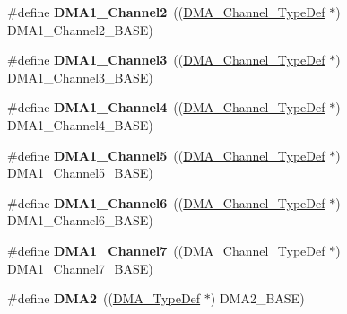 \begin{DoxyCompactItemize}
\item 
\hypertarget{group___peripheral__declaration_ga23d7631dd10c645e06971b2543ba2949}{\#define {\bfseries D\-M\-A1\-\_\-\-Channel2}~((\hyperlink{struct_d_m_a___channel___type_def}{D\-M\-A\-\_\-\-Channel\-\_\-\-Type\-Def} $\ast$) D\-M\-A1\-\_\-\-Channel2\-\_\-\-B\-A\-S\-E)}\label{group___peripheral__declaration_ga23d7631dd10c645e06971b2543ba2949}

\item 
\hypertarget{group___peripheral__declaration_gacf7b6093a37b306d7f1f50b2f200f0d0}{\#define {\bfseries D\-M\-A1\-\_\-\-Channel3}~((\hyperlink{struct_d_m_a___channel___type_def}{D\-M\-A\-\_\-\-Channel\-\_\-\-Type\-Def} $\ast$) D\-M\-A1\-\_\-\-Channel3\-\_\-\-B\-A\-S\-E)}\label{group___peripheral__declaration_gacf7b6093a37b306d7f1f50b2f200f0d0}

\item 
\hypertarget{group___peripheral__declaration_gad2c42743316bf64da557130061b1f56a}{\#define {\bfseries D\-M\-A1\-\_\-\-Channel4}~((\hyperlink{struct_d_m_a___channel___type_def}{D\-M\-A\-\_\-\-Channel\-\_\-\-Type\-Def} $\ast$) D\-M\-A1\-\_\-\-Channel4\-\_\-\-B\-A\-S\-E)}\label{group___peripheral__declaration_gad2c42743316bf64da557130061b1f56a}

\item 
\hypertarget{group___peripheral__declaration_ga06ff98ddef3c962795d2e2444004abff}{\#define {\bfseries D\-M\-A1\-\_\-\-Channel5}~((\hyperlink{struct_d_m_a___channel___type_def}{D\-M\-A\-\_\-\-Channel\-\_\-\-Type\-Def} $\ast$) D\-M\-A1\-\_\-\-Channel5\-\_\-\-B\-A\-S\-E)}\label{group___peripheral__declaration_ga06ff98ddef3c962795d2e2444004abff}

\item 
\hypertarget{group___peripheral__declaration_gac013c4376e4797831b5ddd2a09519df8}{\#define {\bfseries D\-M\-A1\-\_\-\-Channel6}~((\hyperlink{struct_d_m_a___channel___type_def}{D\-M\-A\-\_\-\-Channel\-\_\-\-Type\-Def} $\ast$) D\-M\-A1\-\_\-\-Channel6\-\_\-\-B\-A\-S\-E)}\label{group___peripheral__declaration_gac013c4376e4797831b5ddd2a09519df8}

\item 
\hypertarget{group___peripheral__declaration_ga4f9c23b3d1add93ed206b5c9afa5cda3}{\#define {\bfseries D\-M\-A1\-\_\-\-Channel7}~((\hyperlink{struct_d_m_a___channel___type_def}{D\-M\-A\-\_\-\-Channel\-\_\-\-Type\-Def} $\ast$) D\-M\-A1\-\_\-\-Channel7\-\_\-\-B\-A\-S\-E)}\label{group___peripheral__declaration_ga4f9c23b3d1add93ed206b5c9afa5cda3}

\item 
\hypertarget{group___peripheral__declaration_ga506520140eec1708bc7570c49bdf972d}{\#define {\bfseries D\-M\-A2}~((\hyperlink{struct_d_m_a___type_def}{D\-M\-A\-\_\-\-Type\-Def} $\ast$) D\-M\-A2\-\_\-\-B\-A\-S\-E)}\label{group___peripheral__declaration_ga506520140eec1708bc7570c49bdf972d}


\end{DoxyCompactItemize}
